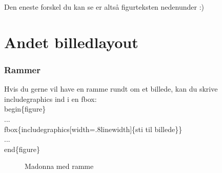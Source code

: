 \noindent
Den eneste forskel du kan se er altså figurteksten nedenunder :)

\section{Andet billedlayout}
\subsubsection{Rammer}
Hvis du gerne vil have en ramme rundt om et billede, kan du skrive \bs includegraphics ind i en \bs fbox:\\

\indent \bs begin\{figure\}\\
\indent ... \\
\indent \bs fbox\{\bs includegraphics[width=.8\bs linewidth]\{sti til billede\}\}\\
\indent ... \\
\indent \bs end\{figure\}\\

\begin{figure}[H]
\centering
{}
\caption{Madonna med ramme}
\label{fig:madonna_ramme}
\end{figure}

